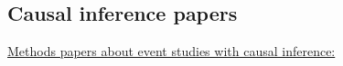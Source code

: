 


\subsection*{Causal inference papers}

\underline{Methods papers about event studies with causal inference:}

